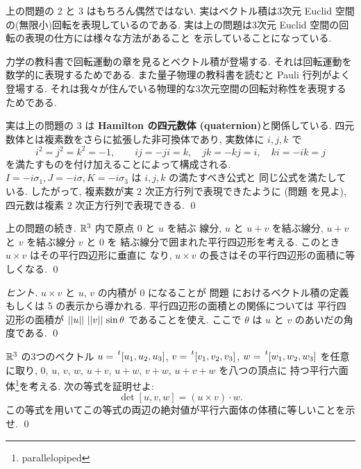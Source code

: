 \documentclass[12pt,twoside]{jarticle}
\begin{document}
\begin{guide}
  上の問題の 2 と 3 はもちろん偶然ではない.
  実はベクトル積は3次元 Euclid 空間の(無限小)回転を表現しているのである.
  実は上の問題は3次元 Euclid 空間の回転の表現の仕方には様々な方法があること
  を示していることになっている.

  力学の教科書で回転運動の章を見るとベクトル積が登場する.
  それは回転運動を数学的に表現するためである.
  また量子物理の教科書を読むと Pauli 行列がよく登場する.
  それは我々が住んでいる物理的な3次元空間の回転対称性を表現するためである.

  実は上の問題の 3 は {\bf Hamilton の四元数体 (quaternion)}と関係している.
  四元数体とは複素数をさらに拡張した非可換体であり, 実数体に $i,j,k$ で
  \begin{equation*}
    i^2=j^2=k^2=-1, \qquad ij=-ji=k, \quad jk=-kj=i, \quad ki=-ik=j    
  \end{equation*}
  を満たすものを付け加えることによって構成される. 
  $I=-i\sigma_1,J=-i\sigma,K=-i\sigma_3$ は $i,j,k$ の満たすべき公式と
  同じ公式を満たしている.
  したがって, 複素数が実 $2$ 次正方行列で表現できたように
  (問題  を見よ), 四元数は複素 $2$ 次正方行列で表現できる.
  \qed
\end{guide}


\begin{question}[ベクトル積と平行四辺形の面積]
  \label{q:|det|=vecArea}
  上の問題の続き. 
  ${\mathbb R}^3$ 内で原点 $0$ と $u$ を結ぶ
  線分, $u$ と $u+v$ を結ぶ線分, $u+v$ と $v$ を結ぶ線分 $v$ と $0$ を
  結ぶ線分で囲まれた平行四辺形を考える.
  このとき $u\times v$ はその平行四辺形に垂直に
  なり, $u\times v$ の長さはその平行四辺形の面積に等しくなる.
  \qed
\end{question}

\begin{proof}[ヒント]
  $u\times v$ と $u$, $v$ の内積が $0$ になることが
  問題  におけるベクトル積の定義もしくは 5 の表示から導かれる.
  平行四辺形の面積との関係については
  平行四辺形の面積が $\left|\left|u\right|\right|\,\left|\left|v\right|\right|\,\sin\theta$ であることを使え.
  ここで $\theta$ は $u$ と $v$ のあいだの角度である.
  \qed
\end{proof}


\begin{question}[平行六面体の体積]
  \label{q:vol-6mentai}
  ${\mathbb R}^3$ の3つのベクトル %
  $u=\tp{[u_1,u_2,u_3]}$, 
  $v=\tp{[v_1,v_2,v_3]}$, 
  $w=\tp{[w_1,w_2,w_3]}$ を任意に取り, 
  $0$, $u$, $v$, $w$, $u+v$, $u+w$, $v+w$, $u+v+w$ を八つの頂点に
  持つ平行六面体\footnote{parallelopiped}を考える.
  次の等式を証明せよ:
  \begin{equation*}
    \det[u,v,w] = (u\times v)\cdot w.
  \end{equation*}
  この等式を用いてこの等式の両辺の絶対値が平行六面体の体積に等しいことを示せ.
  \qed
\end{question}
\end{document}

